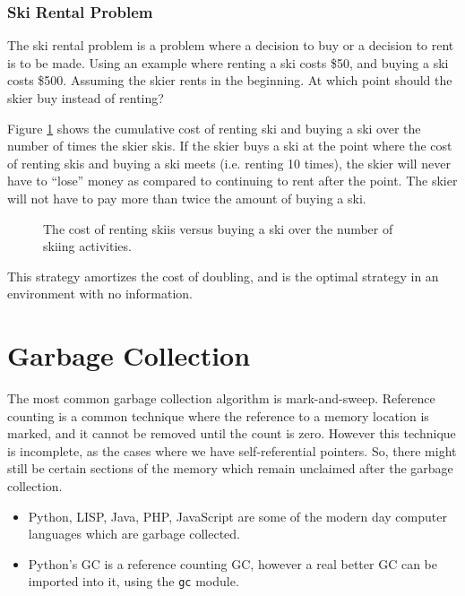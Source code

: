 \documentclass[twoside]{article}
\begin{document}
\subsubsection{Ski Rental Problem}

The ski rental problem is a problem where a decision to buy or a decision to rent is to be made. Using an example where renting a ski costs \$50, and buying a ski costs \$500. Assuming the skier rents in the beginning. At which point should the skier buy instead of renting?

Figure \ref{fig:fig2} shows the cumulative cost of renting ski and buying a ski over the number of times the skier skis. If the skier buys a ski at the point where the cost of renting skis and buying a ski meets (i.e. renting 10 times), the skier will never have to “lose” money as compared to continuing to rent after the point. The skier will not have to pay more than twice the amount of buying a ski.

\begin{figure}[ht!] %
\centering
	\caption{The cost of renting skiis versus buying a ski over the number of skiing activities.}
  	\label{fig:fig2}
\end{figure}

This strategy amortizes the cost of doubling, and is the optimal strategy in an environment with no information.

\section{Garbage Collection}

The most common garbage collection algorithm is mark-and-sweep. Reference counting is a common technique where the reference to a memory location is marked, and it cannot be removed until the count is zero. However this technique is incomplete, as the cases where we have self-referential pointers. So, there might still be certain sections of the memory which remain unclaimed after the garbage collection.

\begin{itemize}
	\itemsep 0cm
	\item Python, LISP, Java, PHP, JavaScript are some of the modern day computer languages which are garbage collected.
	\item Python’s GC is a reference counting GC, however a real better GC can be imported into it, using the \verb#gc# module.
\end{itemize}
\end{document}
